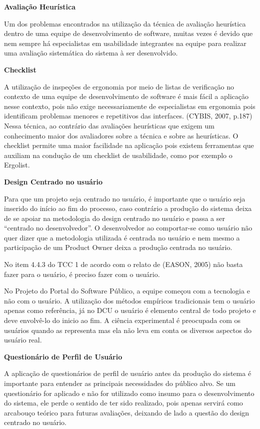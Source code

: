 \textbf{Avaliação Heurística}

Um dos problemas encontrados na utilização da técnica de avaliação heurística dentro de uma equipe de desenvolvimento de software, muitas vezes é devido que nem sempre há especialistas em usabilidade integrantes na equipe para realizar uma avaliação sistemática do sistema à ser desenvolvido.

\textbf{Checklist}

	A utilização de inspeções de ergonomia por meio de listas de verificação no contexto de uma equipe de desenvolvimento de software é mais fácil a aplicação nesse contexto, pois não exige necessariamente de especialistas em ergonomia pois identificam problemas menores e repetitivos das interfaces. (CYBIS, 2007, p.187)
	Nessa técnica, ao contrário das avaliações heurísticas que exigem um conhecimento maior dos avaliadores sobre a técnica e sobre as heurísticas.  O checklist permite uma maior facilidade na aplicação pois existem ferramentas que auxiliam na condução de um checklist de usabilidade, como por exemplo o Ergolist.
	
\textbf{Design Centrado no usuário}

Para que um projeto seja centrado no usuário, é importante que o usuário seja inserido do início ao fim do processo, caso contrário a produção do sistema deixa de se apoiar na metodologia do design centrado no usuário e passa a ser “centrado no desenvolvedor”. O desenvolvedor ao comportar-se como usuário não quer dizer que a metodologia utilizada é centrada no usuário e nem mesmo a participação de um Product Owner deixa a produção centrada no usuário.

No item 4.4.3 do TCC 1 de acordo com o relato de (EASON, 2005) não basta fazer para o usuário, é preciso fazer com o usuário. 

No Projeto do Portal do Software Público, a equipe começou com a tecnologia e não com o usuário. A utilização dos métodos empíricos tradicionais tem o usuário apenas como referência, já no DCU o usuário é elemento central de todo projeto e deve envolvê-lo do inicio ao fim. A ciência experimental é preocupada com os usuários quando as representa mas ela não leva em conta os diversos aspectos do usuário real.

\textbf{Questionário de Perfil de Usuário}
	
	A aplicação de questionários de perfil de usuário antes da produção do sistema é importante para entender as principais necessidades do público alvo. Se um questionário for aplicado e não for utilizado como insumo para o desenvolvimento do sistema, ele perde o sentido de ter sido realizado, pois apenas servirá como arcabouço teórico para futuras avaliações, deixando de lado a questão do design centrado no usuário.

